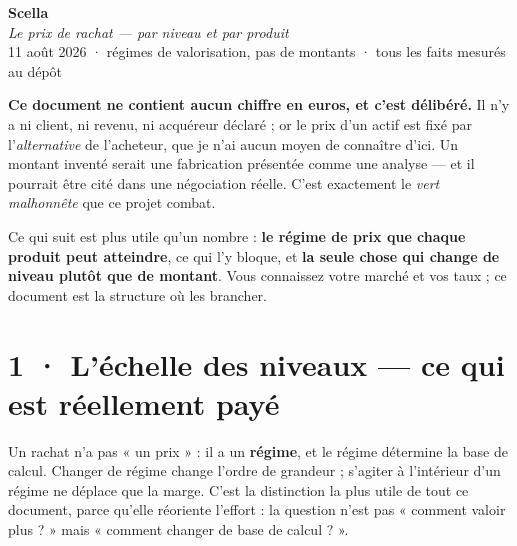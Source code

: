 \documentclass[10pt]{article}
\begin{document}
\begin{center}
{\Huge\bfseries\color{navy} Scella}\\[4pt]
{\large\color{grey}\itshape Le prix de rachat --- par niveau et par produit}\\[4pt]
{\small\color{grey} 11 août 2026 \; · \; régimes de valorisation, pas de montants \; · \; tous les faits mesurés au dépôt}
\end{center}
\vspace{2pt}

\begin{alerte}
\textbf{Ce document ne contient aucun chiffre en euros, et c'est délibéré.} Il n'y a ni client, ni
revenu, ni acquéreur déclaré ; or le prix d'un actif est fixé par l'\emph{alternative} de l'acheteur,
que je n'ai aucun moyen de connaître d'ici. Un montant inventé serait une fabrication présentée comme
une analyse --- et il pourrait être cité dans une négociation réelle. C'est exactement le
\emph{vert malhonnête} que ce projet combat.

Ce qui suit est plus utile qu'un nombre : \textbf{le régime de prix que chaque produit peut atteindre},
ce qui l'y bloque, et \textbf{la seule chose qui change de niveau plutôt que de montant}. Vous
connaissez votre marché et vos taux ; ce document est la structure où les brancher.
\end{alerte}

\section{1 · L'échelle des niveaux --- ce qui est réellement payé}

Un rachat n'a pas « un prix » : il a un \textbf{régime}, et le régime détermine la base de calcul.
Changer de régime change l'ordre de grandeur ; s'agiter à l'intérieur d'un régime ne déplace que la
marge. C'est la distinction la plus utile de tout ce document, parce qu'elle réoriente l'effort : la
question n'est pas « comment valoir plus ? » mais « comment changer de base de calcul ? ».
\end{document}
